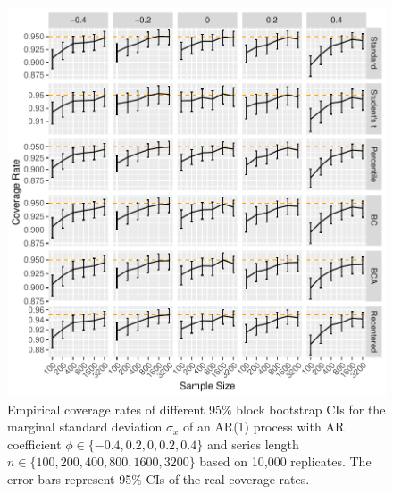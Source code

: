 \documentclass[12pt, letterpaper, titlepage]{article}
\begin{document}
\begin{figure}[tbp]
  \centering
  \includegraphics[width=\textwidth]{figures/plot_norm_sigma}
  \caption{Empirical coverage rates of different 95\% block bootstrap CIs for
    the marginal standard deviation $\sigma_x$ of an AR(1) 
    process with AR coefficient $\phi \in \{-0.4, 0.2, 0, 0.2, 0.4\}$ and
    series length $n \in \{100, 200, 400, 800, 1600, 3200\}$ based on 10,000
    replicates. The error bars represent 95\% CIs of the real coverage rates.}
  \label{fig:sigma}
\end{figure}
\end{document}
